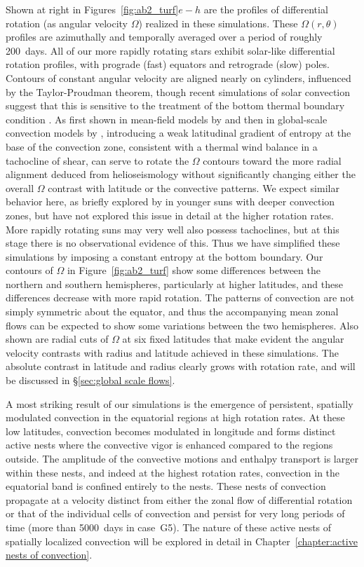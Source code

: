 Shown at right in Figures~\ref{fig:ab2_turf}$e-h$ are the
profiles of differential rotation (as angular velocity $\Omega$)
realized in these simulations.  These $\Omega (r,\theta)$ profiles are
azimuthally and temporally averaged over a period of roughly
200~days.  All of our more rapidly rotating stars exhibit
solar-like differential rotation profiles, with prograde (fast)
equators and retrograde (slow) poles.  Contours of constant angular
velocity are aligned nearly on cylinders, influenced by the
Taylor-Proudman theorem, though recent simulations of solar convection
suggest that this is sensitive to the treatment of the bottom
thermal boundary condition \citep{Miesch_et_al_2006}.  
%
As first shown in mean-field models by \cite{Rempel_2005} and then in
global-scale convection models by \cite{Miesch_et_al_2006},
introducing a weak latitudinal gradient of entropy at 
the base of the convection zone, consistent with a thermal wind balance in a
tachocline of shear, can serve to rotate the $\Omega$ contours toward the more
radial alignment deduced from helioseismology without significantly
changing either the overall $\Omega$ contrast with latitude or the
convective patterns.  We expect similar behavior here, as briefly
explored by \cite{Ballot_et_al_2007} in younger suns with deeper
convection zones, but have not
explored this issue in detail at the higher rotation rates.
More rapidly rotating suns may very well also possess tachoclines,
but at this stage there is no observational evidence of this.
Thus we have simplified these simulations by imposing a constant entropy
at the bottom boundary.
%
Our contours of $\Omega$ in Figure~\ref{fig:ab2_turf} 
show some differences between the northern and southern
hemispheres, particularly at higher latitudes, and these differences
decrease with more rapid rotation.  The patterns of convection are not
simply symmetric about the equator, and thus the accompanying mean
zonal flows can be expected to show some variations between the
two hemispheres.  Also shown are radial cuts of $\Omega$ at six fixed
latitudes that make evident the angular velocity contrasts with radius
and latitude achieved in these simulations.  The absolute contrast in
latitude and radius clearly grows with rotation rate, and will be
discussed in \S\ref{sec:global scale flows}.

A most striking result of our simulations is the emergence of
persistent, spatially modulated convection in the equatorial regions
at high rotation rates.  At these low latitudes, convection becomes
modulated in longitude and forms distinct active nests where the convective
vigor is enhanced compared to the regions outside.  The amplitude
of the convective motions and enthalpy transport is larger within
these nests, and indeed at the highest rotation rates,
convection in the equatorial band is confined entirely to the nests.
These nests of convection propagate at a velocity distinct from either
the zonal flow of differential rotation or that of the individual
cells of convection and persist for very long periods of time (more
than 5000~days in case~G5). The nature of these active nests of
spatially localized convection will be explored in detail in
Chapter~\ref{chapter:active nests of convection}.

